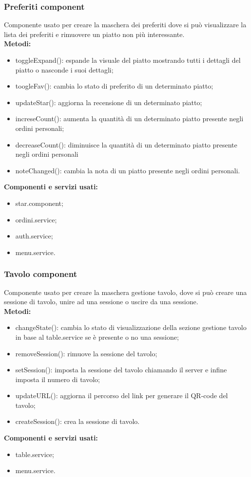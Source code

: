 \subsubsection{Preferiti component}
Componente usato per creare la maschera dei preferiti dove si può visualizzare la lista dei preferiti e rimuovere un piatto non più interessante.\\
\textbf{Metodi:}
\begin{itemize}
    \item toggleExpand(): espande la visuale del piatto mostrando tutti i dettagli del piatto o nasconde i suoi dettagli;
    \item toogleFav(): cambia lo stato di preferito di un determinato piatto;
    \item updateStar(): aggiorna la recensione di un determinato piatto;
    \item increseCount(): aumenta la quantità di un determinato piatto presente negli ordini personali;
    \item decreaseCount(): diminuisce la quantità di un determinato piatto presente negli ordini personali
    \item noteChanged(): cambia la nota di un piatto presente negli ordini personali.
\end{itemize}
\textbf{Componenti e servizi usati:}
\begin{itemize}
    \item star.component;
    \item ordini.service;
    \item auth.service;
    \item menu.service.
\end{itemize}

\subsubsection{Tavolo component}
Componente usato per creare la maschera gestione tavolo, dove si può creare una sessione di tavolo, unire ad una sessione o uscire da una sessione.\\
\textbf{Metodi:}
\begin{itemize}
    \item changeState(): cambia lo stato di visualizzazione della sezione gestione tavolo in base al table.service se è presente o no una sessione;
    \item removeSession(): rimuove la sessione del tavolo;
    \item setSession(): imposta la sessione del tavolo chiamando il server e infine imposta il numero di tavolo;
    \item updateURL(): aggiorna il percorso del link per generare il QR-code del tavolo;
    \item createSession(): crea la sessione di tavolo.
\end{itemize}
\textbf{Componenti e servizi usati:}
\begin{itemize}
    \item table.service;
    \item menu.service.
\end{itemize}

